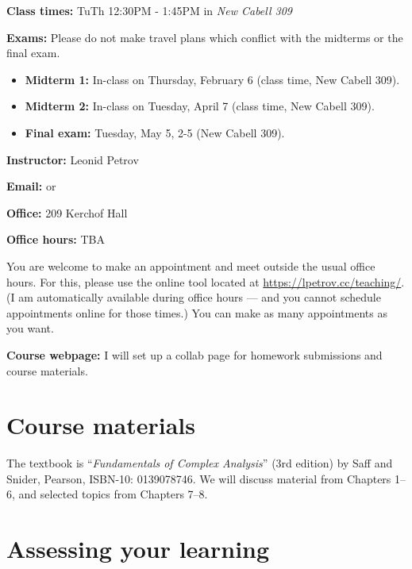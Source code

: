 \documentclass[oneside,11pt]{amsart}
\begin{document}
\textbf{Class times:}   TuTh 12:30PM - 1:45PM in
\emph{New Cabell 309}

\medskip


\textbf{Exams:} Please do not make travel plans which conflict
with the midterms or the final exam.
\begin{itemize}
	\item \textbf{Midterm 1:} In-class on Thursday, February 6 (class time, New Cabell 309).
	\item \textbf{Midterm 2:} In-class on Tuesday, April 7 (class time, New Cabell 309).
	\item \textbf{Final exam:} Tuesday, May 5, 2-5 (New Cabell 309).
\end{itemize}

\medskip

\textbf{Instructor:} Leonid Petrov
\medskip

\textbf{Email:}  or 
\medskip

\textbf{Office:} 209 Kerchof Hall
\medskip


\textbf{Office hours:}
TBA

You are welcome to make an appointment and meet outside the usual office hours. 
For this, please use the online tool located at
\url{https://lpetrov.cc/teaching/}. (I am automatically available during office hours --- 
and you cannot schedule appointments online for those times.)
You can make as 
many appointments as you want.

\medskip

\textbf{Course webpage:}
I will set up a collab page for homework submissions and course materials.

\section{Course materials}

The textbook is “\emph{Fundamentals of Complex Analysis}” (3rd edition)
by Saff and Snider, Pearson, ISBN-10: 0139078746.
We will discuss material from Chapters 1--6, and selected topics from Chapters 7--8.

\section{Assessing your learning}
\end{document}
